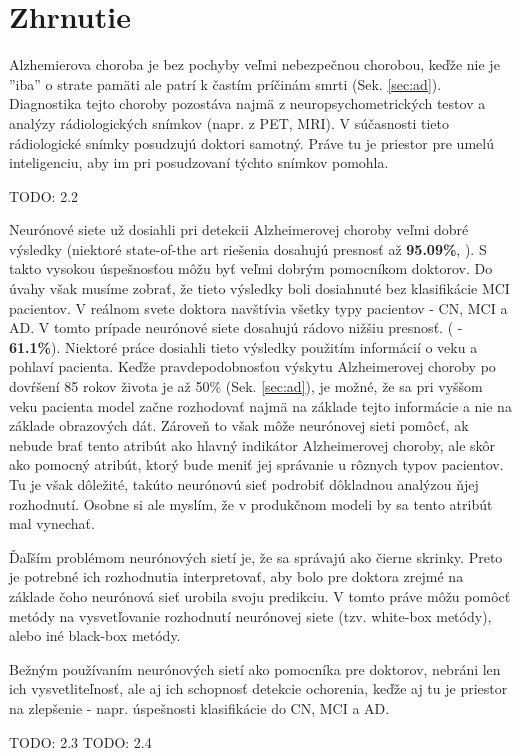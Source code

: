 \section{Zhrnutie}

Alzhemierova choroba je bez pochyby veľmi nebezpečnou chorobou, keďže nie je ''iba'' o strate pamäti ale patrí k častím príčinám smrti (Sek. \ref{sec:ad}). Diagnostika tejto choroby pozostáva najmä z neuropsychometrických testov a analýzy rádiologických snímkov (napr. z PET, MRI). V súčasnosti tieto rádiologické snímky posudzujú doktori samotný. Práve tu je priestor pre umelú inteligenciu, aby im pri posudzovaní týchto snímkov pomohla.

TODO: 2.2

Neurónové siete už dosiahli pri detekcii Alzheimerovej choroby veľmi dobré výsledky (niektoré state-of-the art riešenia dosahujú presnosť až \textbf{95.09\%}, \citeauthor*{suk2016deep}). S takto vysokou úspešnosťou môžu byť veľmi dobrým pomocníkom doktorov. Do úvahy však musíme zobrať, že tieto výsledky boli dosiahnuté bez klasifikácie MCI pacientov. V reálnom svete doktora navštívia všetky typy pacientov - CN, MCI a AD. V tomto prípade neurónové siete dosahujú rádovo nižšiu presnosť. (\citeauthor*{bohle2019layer} - \textbf{61.1\%}). Niektoré práce dosiahli tieto výsledky použitím informácií o veku a pohlaví pacienta. Keďže pravdepodobnosťou výskytu Alzheimerovej choroby po dovŕšení 85 rokov života je až 50\% (Sek. \ref{sec:ad}), je možné, že sa pri vyššom veku pacienta model začne rozhodovať najmä na základe tejto informácie a nie na základe obrazových dát. Zároveň to však môže neurónovej sieti pomôcť, ak nebude brať tento atribút ako hlavný indikátor Alzheimerovej choroby, ale skôr ako pomocný atribút, ktorý bude meniť jej správanie u rôznych typov pacientov. Tu je však dôležité, takúto neurónovú sieť podrobiť dôkladnou analýzou ňjej rozhodnutí. Osobne si ale myslím, že v produkčnom modeli by sa tento atribút mal vynechať. 

Ďaľším problémom neurónových sietí je, že sa správajú ako čierne skrinky. Preto je potrebné ich rozhodnutia interpretovať, aby bolo pre doktora zrejmé na základe čoho neurónová sieť urobila svoju predikciu. V tomto práve môžu pomôcť metódy na vysvetľovanie rozhodnutí neurónovej siete (tzv. white-box metódy), alebo iné black-box metódy.

Bežným používaním neurónových sietí ako pomocníka pre doktorov, nebráni len ich vysvetliteľnosť, ale aj ich schopnosť detekcie ochorenia, keďže aj tu je priestor na zlepšenie - napr. úspešnosti klasifikácie do CN, MCI a AD.

TODO: 2.3
TODO: 2.4

